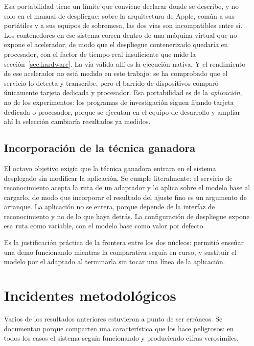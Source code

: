 Esa portabilidad tiene un límite que conviene declarar donde se describe, y no solo en el
manual de despliegue: sobre la arquitectura de Apple, común a sus portátiles y a sus equipos
de sobremesa, las dos vías son incompatibles entre sí. Los contenedores en ese sistema corren
dentro de una máquina virtual que no expone el acelerador, de modo que el despliegue
contenerizado quedaría en procesador, con el factor de tiempo real insuficiente que mide la
sección~\ref{sec:hardware}. La vía válida allí es la ejecución nativa. Y el rendimiento de ese acelerador no está medido en este trabajo: se ha comprobado
que el servicio lo detecta y transcribe, pero el barrido de dispositivos comparó únicamente
tarjeta dedicada y procesador. Esa portabilidad es de la \emph{aplicación}, no de los experimentos:
los programas de investigación siguen fijando tarjeta dedicada o procesador, porque se
ejecutan en el equipo de desarrollo y ampliar ahí la selección cambiaría resultados ya
medidos.

\subsection{Incorporación de la técnica ganadora}
\label{sec:integracion}

El octavo objetivo exigía que la técnica ganadora entrara en el sistema desplegado sin
modificar la aplicación. Se cumple literalmente: el servicio de reconocimiento acepta la
ruta de un adaptador y lo aplica sobre el modelo base al cargarlo, de modo que incorporar el
resultado del ajuste fino es un argumento de arranque. La aplicación no se entera, porque
depende de la interfaz de reconocimiento y no de lo que haya detrás. La configuración de
despliegue expone esa ruta como variable, con el modelo base como valor por defecto.

Es la justificación práctica de la frontera entre los dos núcleos: permitió enseñar una demo
funcionando mientras la comparativa seguía en curso, y sustituir el modelo por el adaptado
al terminarla sin tocar una línea de la aplicación.

\section{Incidentes metodológicos}
\label{sec:incidentes}

Varios de los resultados anteriores estuvieron a punto de ser erróneos. Se documentan
porque comparten una característica que los hace peligrosos: en todos los casos el sistema
seguía funcionando y produciendo cifras verosímiles.


